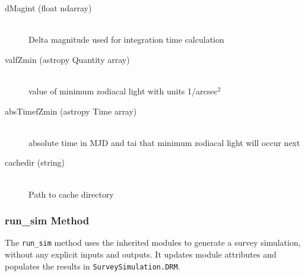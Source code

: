 \documentclass[cleanfoot]{asme2ej}
\begin{document}
\begin{itemize}
\begin{description}
    \item[dMagint (float ndarray)] \hfill \\ Delta magnitude used for integration time calculation
    \item[valfZmin (astropy Quantity array)] \hfill \\ value of minimum zodiacal light with units 1/arcsec$^2$
    \item[absTimefZmin (astropy Time array)] \hfill \\ absolute time in MJD and tai that minimum zodiacal light will occur next
    \item[cachedir (string)] \hfill \\ Path to cache directory
\end{description}
\end{itemize}

\subsubsection{run\_sim Method} \label{sec:runsimtask}
The \verb+run_sim+ method uses the inherited modules to generate a survey simulation, without any explicit inputs and outputs. It updates module attributes and populates the results in \verb+SurveySimulation.DRM+.
\end{document}
